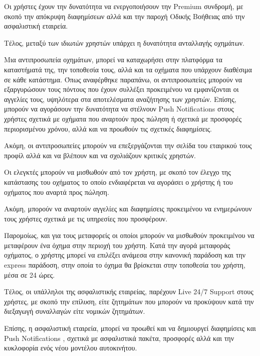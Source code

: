 \documentclass{../ol-softwaremanual}
\begin{document}
	Οι χρήστες έχουν την δυνατότητα να ενεργοποιήσουν την \en Premium \gr συνδρομή, με σκοπό την απόκρυψη διαφημίσεων αλλά και την παροχή Οδικής Βοήθειας από την ασφαλιστική εταιρεία. \break
	
	Τέλος, μεταξύ των ιδιωτών χρηστών υπάρχει η δυνατότητα ανταλλαγής οχημάτων. \break
	
	\vspace{5pt}
	
	Μια αντιπροσωπεία οχημάτων, μπορεί να καταχωρήσει στην πλατφόρμα τα καταστήματά της, την τοποθεσία τους, αλλά και τα οχήματα που υπάρχουν διαθέσιμα σε κάθε κατάστημα. \break 
	Όπως αναφέρθηκε παραπάνω, οι αντιπροσωπείες μπορούν να εξαργυρώσουν τους πόντους που έχουν συλλέξει προκειμένου να εμφανίζονται οι αγγελίες τους, υψηλότερα στα αποτελέσματα αναζήτησης των χρηστών. Επίσης, μπορούν να αγοράσουν την δυνατότητα να στέλνουν \en Push Notifications \gr στους χρήστες σχετικά με οχήματα που αναρτούν προς πώληση ή σχετικά με προσφορές περιορισμένου χρόνου, αλλά και να προωθούν τις σχετικές διαφημίσεις. \break
	
	Ακόμη, οι αντιπροσωπείες μπορούν να επεξεργάζονται την σελίδα του εταιρικού τους προφίλ αλλά και να βλέπουν και να σχολιάζουν κριτικές χρηστών.	 \break 
	
	\vspace{5pt}	
	
	Οι ελεγκτές μπορούν να μισθωθούν από τον χρήστη, με σκοπό τον έλεγχο της κατάστασης του οχήματος το οποίο ενδιαφέρεται να αγοράσει ο χρήστης ή του οχήματος που αναρτά προς πώληση. \break
	
	Ακόμη, μπορούν να αναρτούν αγγελίες και διαφημίσεις προκειμένου να ενημερώνουν τους χρήστες σχετικά με τις υπηρεσίες που προσφέρουν. \break
	
	Παρομοίως, και για τους μεταφορείς οι οποίοι μπορούν να μισθωθούν προκειμένου να μεταφέρουν ένα όχημα στην περιοχή του χρήστη. Κατά την αγορά μεταφοράς οχήματος, ο χρήστης μπορεί να επιλέξει ανάμεσα στην κανονική παράδοση και την \en express \gr παράδοση, στην οποία το όχημα θα βρίσκεται στην τοποθεσία του χρήστη, μέσα σε 24 ώρες.		\break
	
	
	Τέλος, οι υπάλληλοι της ασφαλιστικής εταιρείας, παρέχουν \en Live 24/7 Support \gr στους χρήστες, με σκοπό την επίλυση, είτε ζητημάτων που μπορούν να προκύψουν κατά την διεξαγωγή συναλλαγών είτε νομικών ζητημάτων. \break
	
	Επίσης, η ασφαλιστική εταιρεία, μπορεί να προωθεί και να δημιουργεί διαφημίσεις και \en Push Notifications \gr, σχετικά με ασφαλιστικά πακέτα, προσφορές αλλά και την κυκλοφορία ενός νέου μοντέλου αυτοκινήτου. \break
	
\end{document}
